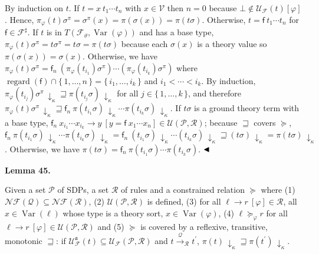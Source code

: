 By induction on $t$. If $t={x}\ {{t}_{1}\cdots{t}_{n}}$ with $x\in\mathcal{V}$ then $n=0$ because $\bot\notin\mathcal{U}_{\mathcal{F}}(t)[\varphi]$. Hence, $\pi_{\varphi}(t)\sigma^{\pi}=\sigma^{\pi}(x)=\pi(\sigma(x))=\pi(t\sigma)$. Otherwise, $t={\mathsf{f}}\ {{t}_{1}\cdots{t}_{n}}$ for $\mathsf{f}\in\mathcal{F}^{\sharp}$. If $t$ is in $T({\mathcal{F}}_{\vartheta},\operatorname{Var}(\varphi))$ and has a base type, $\pi_{\varphi}(t)\sigma^{\pi}=t\sigma^{\pi}=t\sigma=\pi(t\sigma)$ because each $\sigma(x)$ is a theory value so $\pi(\sigma(x))=\sigma(x)$. Otherwise, we have $\pi_{\varphi}(t)\sigma^{\pi}={\mathsf{f}_{n}}\ {(\pi_{\varphi}(t_{i_{1}})\sigma^{\pi})\cdots(\pi_{\varphi}(t_{i_{k}})\sigma^{\pi})}$ where $\operatorname{regard}(\mathsf{f})\cap\{\,1,\ldots,n\,\}=\{\,{i}_{1},\ldots,{i}_{k}\,\}$ and ${i}_{1}<\cdots<{i}_{k}$. By induction, $\pi_{\varphi}(t_{i_{j}})\sigma^{\pi}\,{\downarrow}_{\kappa}\sqsupseteq\pi(t_{i_{j}}\sigma)\,{\downarrow}_{\kappa}$ for all $j\in\{\,1,\ldots,k\,\}$, and therefore $\pi_{\varphi}(t)\sigma^{\pi}\,{\downarrow}_{\kappa}\sqsupseteq{\mathsf{f}_{n}}\ {\pi(t_{i_{1}}\sigma)\,{\downarrow}_{\kappa}\cdots\pi(t_{i_{k}}\sigma)\,{\downarrow}_{\kappa}}$. If $t\sigma$ is a ground theory term with a base type, ${{\mathsf{f}_{n}}\ {x_{i_{1}}\cdots x_{i_{k}}}}\rightarrow{y}\ [y={\mathsf{f}}\ {{x}_{1}\cdots{x}_{n}}]\in\mathcal{U}(\mathcal{P},\mathcal{R})$; because $\sqsupseteq$ covers $\succeq$, ${\mathsf{f}_{n}}\ {\pi(t_{i_{1}}\sigma)\,{\downarrow}_{\kappa}\cdots\pi(t_{i_{k}}\sigma)\,{\downarrow}_{\kappa}}={\mathsf{f}_{n}}\ {(t_{i_{1}}\sigma)\,{\downarrow}_{\kappa}\cdots(t_{i_{k}}\sigma)\,{\downarrow}_{\kappa}}\sqsupseteq(t\sigma)\,{\downarrow}_{\kappa}=\pi(t\sigma)\,{\downarrow}_{\kappa}$. Otherwise, we have $\pi(t\sigma)={\mathsf{f}_{n}}\ {\pi(t_{i_{1}}\sigma)\cdots\pi(t_{i_{k}}\sigma)}$. $\hfill\blacktriangleleft$\par
 
 
 
\par\medskip\noindent\textbf{Lemma 45.}\par
 
 
Given a set $\mathcal{P}$ of SDPs, a set $\mathcal{R}$ of rules and a constrained relation $\succeq$ where (1) $\mathcal{N}\!\mathcal{F}(\mathcal{Q})\subseteq\mathcal{N}\!\mathcal{F}(\mathcal{R})$, (2) $\mathcal{U}(\mathcal{P},\mathcal{R})$ is defined, (3) for all ${\ell}\rightarrow{r}\ [\varphi]\in\mathcal{R}$, all $x\in\operatorname{Var}(\ell)$ whose type is a theory sort, $x\in\operatorname{Var}(\varphi)$, (4) ${\ell}\mathrel{\succeq}_{\varphi}{r}$ for all ${\ell}\rightarrow{r}\ [\varphi]\in\mathcal{U}(\mathcal{P},\mathcal{R})$ and (5) $\succeq$ is covered by a reflexive, transitive, monotonic $\sqsupseteq$: if $\mathcal{U}_{\mathcal{F}}^{\mathfrak{a}}(t)\subseteq\mathcal{U}_{\mathcal{F}}(\mathcal{P},\mathcal{R})$ and $t\xrightarrow{\scriptscriptstyle\mathcal{Q}}_{\mathcal{R}}t^{\prime}$, $\pi(t)\,{\downarrow}_{\kappa}\sqsupseteq\pi(t^{\prime})\,{\downarrow}_{\kappa}$.\par
 
